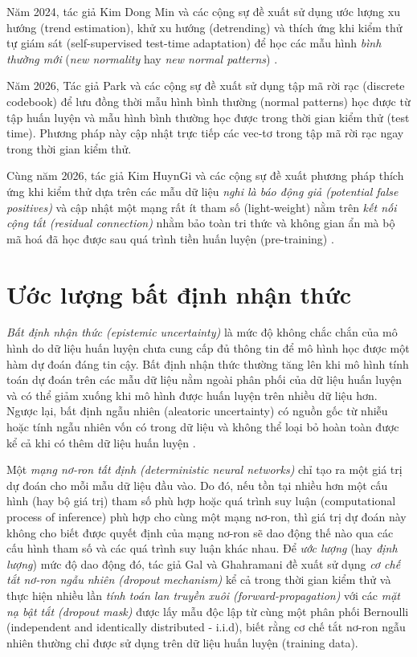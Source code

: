 Năm 2024, tác giả Kim Dong Min và các cộng sự đề xuất sử dụng ước lượng xu hướng (trend estimation), khử xu hướng (detrending) và thích ứng khi kiểm thử tự giám sát (self-supervised test-time adaptation) để học các mẫu hình \textit{bình thường mới} (\textit{new normality} hay \textit{new normal patterns}) \cite{Kim_Park_Choo_2024}.

Năm 2026, Tác giả Park và các cộng sự đề xuất sử dụng tập mã rời rạc (discrete codebook) để lưu đồng thời mẫu hình bình thường (normal patterns) học được từ tập huấn luyện và mẫu hình bình thường học được trong thời gian kiểm thử (test time). Phương pháp này cập nhật trực tiếp các vec-tơ trong tập mã rời rạc ngay trong thời gian kiểm thử.

Cùng năm 2026, tác giả Kim HuynGi và các cộng sự đề xuất phương pháp thích ứng khi kiểm thử dựa trên các mẫu dữ liệu \textit{nghi là báo động giả (potential false positives)} và cập nhật một mạng rất ít tham số (light-weight) nằm trên \textit{kết nối cộng tắt (residual connection)} nhằm bảo toàn tri thức và không gian ẩn mà bộ mã hoá đã học được sau quá trình tiền huấn luyện (pre-training) \cite{Kim_Mok_Lee_Shin_Yoon_2026}.

\section{Ước lượng bất định nhận thức}
\textit{Bất định nhận thức (epistemic uncertainty)} là mức độ không chắc chắn của mô hình do dữ liệu huấn luyện chưa cung cấp đủ thông tin để mô hình học được một hàm dự đoán đáng tin cậy. Bất định nhận thức thường tăng lên khi mô hình tính toán dự đoán trên các mẫu dữ liệu nằm ngoài phân phối của dữ liệu huấn luyện và có thể giảm xuống khi mô hình được huấn luyện trên nhiều dữ liệu hơn. Ngược lại, bất định ngẫu nhiên (aleatoric uncertainty) có nguồn gốc từ nhiễu hoặc tính ngẫu nhiên vốn có trong dữ liệu và không thể loại bỏ hoàn toàn được kể cả khi có thêm dữ liệu huấn luyện \cite{kendall2017uncertainties} \cite{deng2023uncertainty}.

Một \textit{mạng nơ-ron tất định (deterministic neural networks)} chỉ tạo ra một giá trị dự đoán cho mỗi mẫu dữ liệu đầu vào. Do đó, nếu tồn tại nhiều hơn một cấu hình (hay bộ giá trị) tham số phù hợp hoặc quá trình suy luận (computational process of inference) phù hợp cho cùng một mạng nơ-ron, thì giá trị dự đoán này không cho biết được quyết định của mạng nơ-ron sẽ dao động thế nào qua các cấu hình tham số và các quá trình suy luận khác nhau. Để \textit{ước lượng} (hay \textit{định lượng}) mức độ dao động đó, tác giả Gal và Ghahramani đề xuất sử dụng \textit{cơ chế tắt nơ-ron ngẫu nhiên (dropout mechanism)} \cite{2627435.2670313} kể cả trong thời gian kiểm thử và thực hiện nhiều lần \textit{tính toán lan truyền xuôi (forward-propagation)} với các \textit{mặt nạ bật tắt (dropout mask)} được lấy mẫu độc lập từ cùng một phân phối Bernoulli (independent and identically distributed - i.i.d), biết rằng cơ chế tắt nơ-ron ngẫu nhiên thường chỉ được sử dụng trên dữ liệu huấn luyện (training data).

